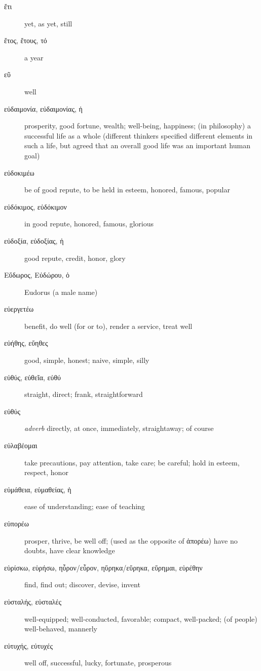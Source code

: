 \documentclass[12pt,letterpaper]{article}
\begin{document}
\begin{description}
    \item[\textgreek{ἔτι}] \marginnote{*}yet, as yet, still
    \item[\textgreek{ἔτος, ἔτους, τό}] \marginnote{*}a year
    \item[\textgreek{εῦ}] \marginnote{*}well
    \item[\textgreek{εὐδαιμονία, εὐδαιμονίας, ἡ}] prosperity, good fortune, wealth; well-being, happiness; (in philosophy) a successful life as a whole (different thinkers specified different elements in such a life, but agreed that an overall good life was an important human goal)
    \item[\textgreek{εὐδοκιμέω}] be of good repute, to be held in esteem, honored, famous, popular
    \item[\textgreek{εὐδόκιμος, εὐδόκιμον}] in good repute, honored, famous, glorious
    \item[\textgreek{εὐδοξία, εὐδοξίας, ἡ}] good repute, credit, honor, glory
    \item[\textgreek{Εὔδωρος, Εὐδώρου, ὁ}] Eudorus (a male name)
    \item[\textgreek{εὐεργετέω}] benefit, do well (for or to), render a service, treat well
    \item[\textgreek{εὐήθης, εὔηθες}] good, simple, honest; naive, simple, silly
    \item[\textgreek{εὐθύς, εὐθεῖα, εὐθύ}] \marginnote{*}straight, direct; frank, straightforward
    \item[\textgreek{εὐθύς}] \marginnote{*}\textit{adverb} directly, at once, immediately, straightaway; of course
    \item[\textgreek{εὐλαβέομαι}] take precautions, pay attention, take care; be careful; hold in esteem, respect, honor
    \item[\textgreek{εὐμάθεια, εὐμαθείας, ἡ}] ease of understanding; ease of teaching
    \item[\textgreek{εὐπορέω}] prosper, thrive, be well off; (used as the opposite of \textgreek{ἀπορέω}) have no doubts, have clear knowledge
    \item[\textgreek{εὑρίσκω, εὑρήσω, ηὗρον/εὗρον, ηὕρηκα/εὕρηκα, εὕρημαι, εὑρέθην}] \marginnote{*}find, find out; discover, devise, invent
    \item[\textgreek{εὐσταλής, εὐσταλές}] well-equipped; well-conducted, favorable; compact, well-packed; (of people) well-behaved, mannerly
    \item[\textgreek{εὐτυχής, εὐτυχές}] well off, successful, lucky, fortunate, prosperous

\end{description}
\end{document}
